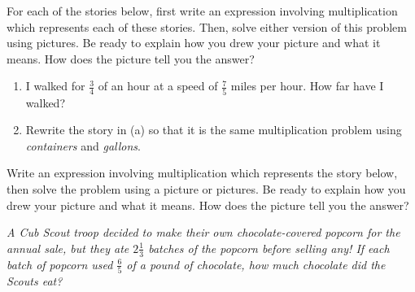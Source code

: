 \documentclass{ximera}
\begin{document}
\begin{problem}
 For each of the stories below, first write an expression involving multiplication which represents each of these stories.  Then, solve either version of this problem using pictures.  Be ready to explain how you drew your picture and what it means.  How does the picture tell you the answer? 

\begin{enumerate}
    \item I walked for  $\frac{3}{4}$ of an hour at a speed of  $\frac{7}{5}$ miles per hour.  How far have I walked?
    \item Rewrite the story in (a) so that it is the same multiplication problem using \emph{containers} and \emph{gallons}.
\end{enumerate}
\end{problem}
\vfill

\begin{problem}
 Write an expression involving multiplication which represents the story below, then solve the problem using a picture or pictures.  Be ready to explain how you drew your picture and what it means.  How does the picture tell you the answer?


\emph{A Cub Scout troop decided to make their own chocolate-covered popcorn for the annual sale, but they ate $2 \frac{1}{3}$ batches of the popcorn before selling any! If each batch of popcorn used $\frac{6}{5}$ of a pound of chocolate, how much chocolate did the Scouts eat?}

\end{problem}
\vfill
 
\end{document}
